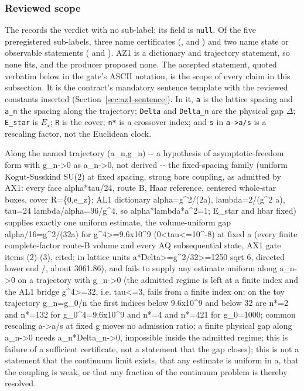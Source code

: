 \subsubsection{Reviewed scope}
\label{sec:az1-scope}
The  records the
verdict  with no sub-label: its
 field is \texttt{null}. Of the five preregistered
sub-labels, three name certificates (,
 and ) and
two name state or observable statements
( and
). AZ1 is a dictionary and trajectory statement, so
none fits, and the producer proposed none. The accepted statement, quoted
verbatim below in the gate's ASCII notation, is the scope of every claim in
this subsection. It is the contract's mandatory sentence template with the
reviewed constants inserted (Section~\ref{sec:az1-sentence}). In it,
\texttt{a} is the lattice spacing and \texttt{a\_n} the spacing along the
trajectory; \texttt{Delta} and \texttt{Delta\_n} are the physical gap
$\Delta$; \texttt{E\_star} is $E_\star$; \texttt{R} is the cover;
\texttt{n*} is a crossover index; and \texttt{s} in \texttt{a->a/s} is a
rescaling factor, not the Euclidean clock.
\begin{gatequote}
Along the named trajectory (a\_n,g\_n) -{}- a hypothesis of asymptotic-freedom
form with g\_n->0 as a\_n->0, not derived -{}- the fixed-spacing family
(uniform Kogut-Susskind SU(2) at fixed spacing, strong bare coupling, as
admitted by AX1: every face alpha*tau/24, route B, Haar reference, centered
whole-star boxes, cover R=\{0,e\_z\}; AL1 dictionary
alpha=g\textasciicircum{}2/(2a), lambda=2/(g\textasciicircum{}2 a), tau=24
lambda/alpha=96/g\textasciicircum{}4, so alpha*lambda*a\textasciicircum{}2=1;
E\_star and hbar fixed) supplies exactly one uniform estimate, the
volume-uniform gap alpha/16=g\textasciicircum{}2/(32a) for
g\textasciicircum{}4>=9.6x10\textasciicircum{}9
(0<tau<=10\textasciicircum{}-8) at fixed a (every finite complete-factor
route-B volume and every AQ subsequential state, AX1 gate items (2)-(3),
cited; in lattice units a*Delta>=g\textasciicircum{}2/32>=1250 sqrt 6,
directed lower end /, about 3061.86), and fails to supply any
estimate uniform along a\_n->0 on a trajectory with g\_n->0 (the admitted
regime is left at a finite index and the AL1 bridge g\textasciicircum{}4>=32,
i.e. tau<=3, fails from a finite index on; on the toy trajectory g\_n=g\_0/n
the first indices below 9.6x10\textasciicircum{}9 and below 32 are n*=2 and
n*=132 for g\_0\textasciicircum{}4=9.6x10\textasciicircum{}9 and n*=4 and
n*=421 for g\_0=1000; common rescaling a->a/s at fixed g moves no admission
ratio; a finite physical gap along a\_n->0 needs a\_n*Delta\_n->0, impossible
inside the admitted regime; this is failure of a sufficient certificate, not a
statement that the gap closes); this is not a statement that the continuum
limit exists, that any estimate is uniform in a, that the coupling is weak, or
that any fraction of the continuum problem is thereby resolved.
\end{gatequote}
